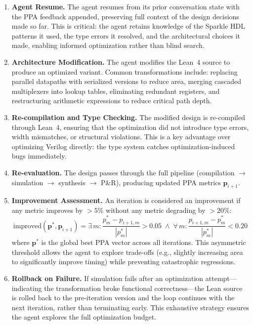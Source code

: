 \begin{enumerate}[leftmargin=*,itemsep=1pt,topsep=2pt]
    \item \textbf{Agent Resume.} The agent resumes from its prior conversation state with the PPA feedback appended, preserving full context of the design decisions made so far. This is critical: the agent retains knowledge of the Sparkle HDL patterns it used, the type errors it resolved, and the architectural choices it made, enabling informed optimization rather than blind search.
    \item \textbf{Architecture Modification.} The agent modifies the Lean~4 source to produce an optimized variant. Common transformations include: replacing parallel datapaths with serialized versions to reduce area, merging cascaded multiplexers into lookup tables, eliminating redundant registers, and restructuring arithmetic expressions to reduce critical path depth.
    \item \textbf{Re-compilation and Type Checking.} The modified design is re-compiled through Lean~4, ensuring that the optimization did not introduce type errors, width mismatches, or structural violations. This is a key advantage over optimizing Verilog directly: the type system catches optimization-induced bugs immediately.
    \item \textbf{Re-evaluation.} The design passes through the full pipeline (compilation $\to$ simulation $\to$ synthesis $\to$ P\&R), producing updated PPA metrics $\mathbf{p}_{i+1}$.
    \item \textbf{Improvement Assessment.} An iteration is considered an improvement if any metric improves by ${>}5\%$ without any metric degrading by ${>}20\%$:
    \begin{equation}
        \text{improved}(\mathbf{p}^*, \mathbf{p}_{i+1}) = \exists\, m: \frac{p^*_m - p_{i+1,m}}{|p^*_m|} > 0.05 \;\wedge\; \forall\, m: \frac{p_{i+1,m} - p^*_m}{|p^*_m|} < 0.20
    \end{equation}
    where $\mathbf{p}^*$ is the global best PPA vector across all iterations. This asymmetric threshold allows the agent to explore trade-offs (e.g., slightly increasing area to significantly improve timing) while preventing catastrophic regressions.
    \item \textbf{Rollback on Failure.} If simulation fails after an optimization attempt---indicating the transformation broke functional correctness---the Lean source is rolled back to the pre-iteration version and the loop continues with the next iteration, rather than terminating early. This exhaustive strategy ensures the agent explores the full optimization budget.
\end{enumerate}

